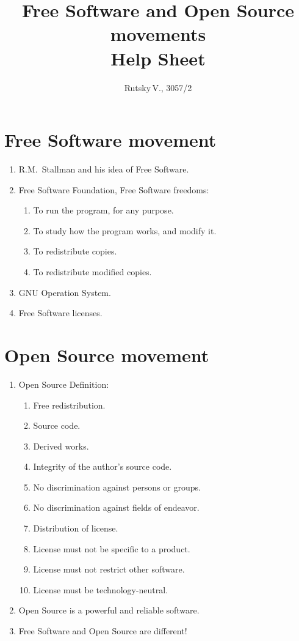 \documentclass[10pt,a4paper]{article}
\title{Free Software and Open Source movements \\ Help Sheet}
\author{Rutsky\,V., 3057/2}
\newcommand{\bee}{\begin{enumerate}\setlength{\itemsep}{-0.6mm}}
\newcommand{\ene}{\end{enumerate}}
\begin{document}
\maketitle
\thispagestyle{empty}



\begin{multicols}{2}

\section{Free Software movement}

\bee
  \item R.M.~Stallman and his idea of Free Software.
  \item Free Software Foundation, Free Software freedoms:
  \bee
    \item[0.] To run the program, for any purpose.
    \item[1.] To study how the program works, and modify it.
    \item[2.] To redistribute copies.
    \item[3.] To redistribute modified copies.
  \ene
  \item GNU Operation System.
  \item Free Software licenses.
\ene

\section{Open Source movement}
\bee
  \item Open Source Definition:
  \bee
    \item[1.] Free redistribution.
    \item[2.] Source code.
    \item[3.] Derived works.
    \item[4.] Integrity of the author's source code.
    \item[5.] No discrimination against persons or groups.
    \item[6.] No discrimination against fields of endeavor.
    \item[7.] Distribution of license.
    \item[8.] License must not be specific to a product.
    \item[9.] License must not restrict other software.
    \item[10.] License must be technology-neutral.
  \ene
  \item Open Source is a powerful and reliable software.
  \item Free Software and Open Source are different!
\ene


\end{multicols}
\end{document}
